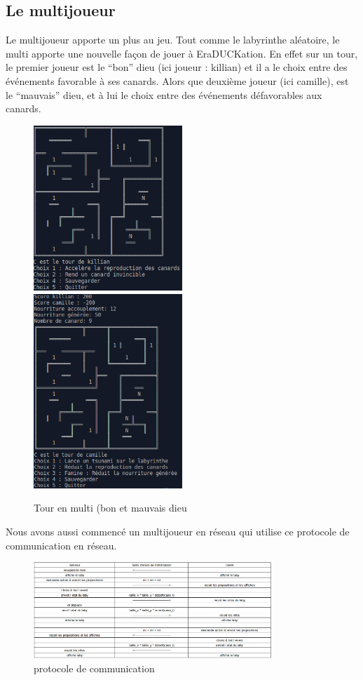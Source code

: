 \documentclass[12pt,a4paper,twoside]{article}
\begin{document}
\subsection{Le multijoueur}
Le multijoueur apporte un plus au jeu. Tout comme le labyrinthe aléatoire, le multi
apporte une nouvelle façon de jouer à EraDUCKation. En effet sur un tour, le premier joueur est le “bon” dieu (ici joueur : killian) et il a le choix entre des événements favorable à ses canards. Alors que deuxième joueur (ici camille), est le “mauvais” dieu, et à lui le choix entre des événements défavorables aux canards.
\begin{figure}[h]
\includegraphics[width=0.5\textwidth]{tour_kiki.png}
\includegraphics[width=0.5\textwidth]{tour_cam.png}
\caption{Tour en multi (bon et mauvais dieu}
\end{figure}
Nous avons aussi commencé un multijoueur en réseau qui utilise ce protocole de communication en réseau.
\begin{figure}[h]
\centering
\includegraphics[width=0.8\textwidth]{reseau.png}
\caption{protocole de communication}
\end{figure}
\newpage
\end{document}
